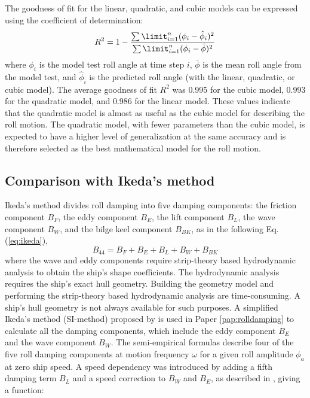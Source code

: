 The goodness of fit for the linear, quadratic, and cubic models can be expressed using the coefficient of determination:
\begin{equation} \label{eq:R2}
R^2=1-\frac{\sum\limit_{i=1}^{n}(\phi_{i}-\hat{\phi}_i)^2}{\sum\limit_{i=1}^{n}(\phi_i-\bar \phi)^2}
\end{equation}
where $\phi_i$ is the model test roll angle at time step $i$, $\bar \phi$ is the mean roll angle from the model test, and $\hat{\phi}_i$ is the predicted roll angle (with the linear, quadratic, or cubic model). The average goodness of fit $R^2$ was 0.995 for the cubic model, 0.993 for the quadratic model, and 0.986 for the linear model. These values indicate that the quadratic model is almost as useful as the cubic model for describing the roll motion. The quadratic model, with fewer parameters than the cubic model, is expected to have a higher level of generalization at the same accuracy and is therefore selected as the best mathematical model for the roll motion. 

\subsection{Comparison with Ikeda's method}
Ikeda's method divides roll damping into five damping components: the friction component $B_F$, the eddy component $B_E$, the lift component $B_L$, the wave component $B_W$, and the bilge keel component $B_{BK}$, as in the following Eq.(\ref{eq:ikeda}), 
\begin{equation} \label{eq:ikeda}
B_{44} = B_F + B_E + B_L + B_W + B_{BK}
\end{equation}
where the wave and eddy components require strip-theory based hydrodynamic analysis to obtain the ship's shape coefficients. The hydrodynamic analysis requires the ship's exact hull geometry. Building the geometry model and performing the strip-theory based hydrodynamic analysis are time-consuming. A ship's hull geometry is not always available for such purposes. A simplified Ikeda's method (SI-method) proposed by \textcite{kawahara_simple_2011} is used in Paper \ref{pap:rolldamping} to calculate all the damping components, which include the eddy component $B_E$ and the wave component $B_W$. The semi-empirical formulas describe four of the five roll damping components at motion frequency $\omega$ for a given roll amplitude $\phi_a$ at zero ship speed. A speed dependency was introduced by adding a fifth damping term $B_L$ and a speed correction to $B_W$ and $B_E$, as described in \textcite{ikeda_velocity_1979}, giving a function: 


